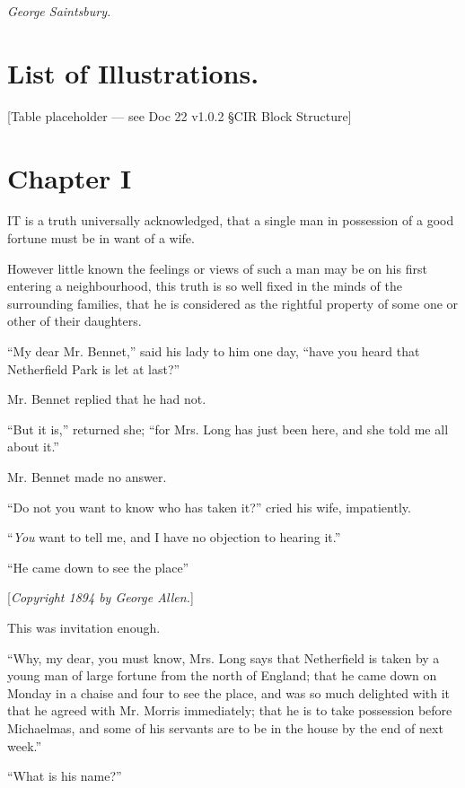 \documentclass[12pt,openright]{book}
\begin{document}
\textit{George Saintsbury.}


\chapter*{List of Illustrations.}

\begin{center}
[Table placeholder — see Doc 22 v1.0.2 §CIR Block Structure]
\end{center}

\chapter{Chapter I}

\noindent IT is a truth universally acknowledged, that a single man in possession of a good fortune must be in want of a wife.

However little known the feelings or views of such a man may be on his first entering a neighbourhood, this truth is so well fixed in the minds of the surrounding families, that he is considered as the rightful property of some one or other of their daughters.

“My dear Mr. Bennet,” said his lady to him one day, “have you heard that Netherfield Park is let at last?”

Mr. Bennet replied that he had not.

“But it is,” returned she; “for Mrs. Long has just been here, and she told me all about it.”

Mr. Bennet made no answer.

“Do not you want to know who has taken it?” cried his wife, impatiently.

“\textit{You} want to tell me, and I have no objection to hearing it.”

“He came down to see the place”


[\textit{Copyright 1894 by George Allen.}]

This was invitation enough.

“Why, my dear, you must know, Mrs. Long says that Netherfield is taken by a young man of large fortune from the north of England; that he came down on Monday in a chaise and four to see the place, and was so much delighted with it that he agreed with Mr. Morris immediately; that he is to take possession before Michaelmas, and some of his servants are to be in the house by the end of next week.”

“What is his name?”
\end{document}
